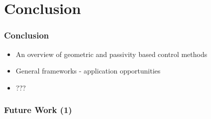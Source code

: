 \section{Conclusion}

\begin{frame}
	\frametitle{Conclusion}
	
	\begin{itemize}
		\item An overview of geometric and passivity based control methods
		\item General frameworks - application opportunities
		\item ???
	\end{itemize}
\end{frame}

\begin{frame}
	\frametitle{Future Work (1)}
\end{frame}

